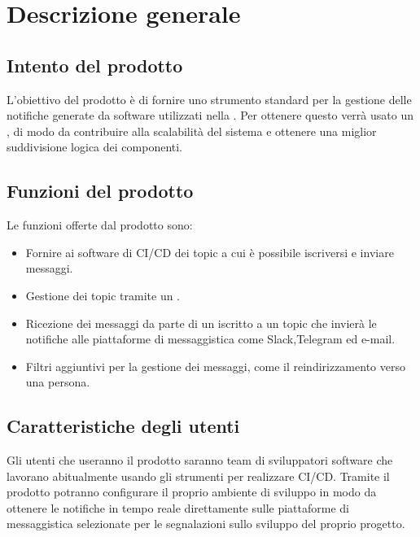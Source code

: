 \section{Descrizione generale}

	\subsection{Intento del prodotto}
    
    L'obiettivo del prodotto è di fornire uno strumento standard per la gestione delle notifiche generate da software utilizzati nella .
    Per ottenere questo verrà usato un , di modo da contribuire alla scalabilità del sistema e ottenere una miglior suddivisione logica dei componenti.
	
	\subsection{Funzioni del prodotto}
	
    Le funzioni offerte dal prodotto sono:
    \begin{itemize}
		\item Fornire ai software di CI/CD dei topic a cui è possibile iscriversi e inviare messaggi.
		\item Gestione dei topic tramite un .
        \item Ricezione dei messaggi da parte di un  iscritto a un topic che invierà le notifiche alle piattaforme di messaggistica come Slack,Telegram ed e-mail.
        \item Filtri aggiuntivi per la gestione dei messaggi, come il reindirizzamento verso una persona.
	\end{itemize}

	\subsection{Caratteristiche degli utenti}
    
    Gli utenti che useranno il prodotto saranno team di sviluppatori software che lavorano abitualmente usando gli strumenti per realizzare CI/CD.
    Tramite il prodotto potranno configurare il proprio ambiente di sviluppo in modo da ottenere le notifiche in tempo reale direttamente sulle piattaforme di messaggistica selezionate per le segnalazioni sullo sviluppo del proprio progetto.
	

